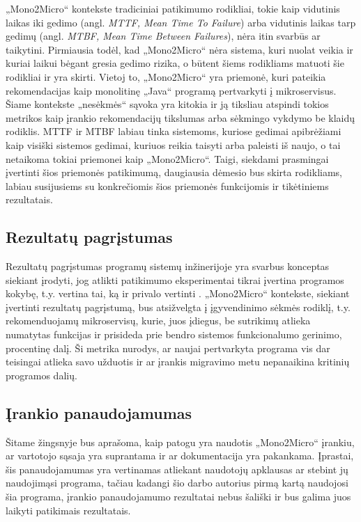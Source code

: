 \documentclass{VUMIFPSbakalaurinis}
\begin{document}
„Mono2Micro“ kontekste tradiciniai patikimumo rodikliai, tokie kaip vidutinis laikas iki gedimo (angl. \emph{MTTF, Mean Time To Failure}) arba vidutinis laikas tarp gedimų (angl. \emph{MTBF, Mean Time Between Failures}), nėra itin svarbūs ar taikytini. Pirmiausia todėl, kad „Mono2Micro“ nėra sistema, kuri nuolat veikia ir kuriai laikui bėgant gresia gedimo rizika, o būtent šiems rodikliams matuoti šie rodikliai ir yra skirti. Vietoj to, „Mono2Micro“ yra priemonė, kuri pateikia rekomendacijas kaip monolitinę „Java“ programą pertvarkyti į mikroservisus. Šiame kontekste „nesėkmės“ sąvoka yra kitokia ir ją tiksliau atspindi tokios metrikos kaip įrankio rekomendacijų tikslumas arba sėkmingo vykdymo be klaidų rodiklis. MTTF ir MTBF labiau tinka sistemoms, kuriose gedimai apibrėžiami kaip visiški sistemos gedimai, kuriuos reikia taisyti arba paleisti iš naujo, o tai netaikoma tokiai priemonei kaip „Mono2Micro“. Taigi, siekdami prasmingai įvertinti šios priemonės patikimumą, daugiausia dėmesio bus skirta rodikliams, labiau susijusiems su konkrečiomis šios priemonės funkcijomis ir tikėtiniems rezultatais.

\subsection{Rezultatų pagrįstumas}
Rezultatų pagrįstumas programų sistemų inžinerijoje yra svarbus konceptas siekiant įrodyti, jog atlikti patikimumo eksperimentai tikrai įvertina programos kokybę, t.y. vertina tai, ką ir privalo vertinti \cite{LMPV}. „Mono2Micro“ kontekste, siekiant įvertinti rezultatų pagrįstumą, bus atsižvelgta į įgyvendinimo sėkmės rodiklį, t.y. rekomenduojamų mikroservisų, kurie, juos įdiegus, be sutrikimų atlieka numatytas funkcijas ir prisideda prie bendro sistemos funkcionalumo gerinimo, procentinę dalį. Ši metrika nurodys, ar naujai pertvarkyta programa vis dar teisingai atlieka savo užduotis ir ar įrankis migravimo metu nepanaikina kritinių programos dalių.

\subsection{Įrankio panaudojamumas}
Šitame žingsnyje bus aprašoma, kaip patogu yra naudotis „Mono2Micro“ įrankiu, ar vartotojo sąsaja yra suprantama ir ar dokumentacija yra pakankama. Įprastai, šis panaudojamumas yra vertinamas atliekant naudotojų apklausas ar stebint jų naudojimąsi programa, tačiau kadangi šio darbo autorius pirmą kartą naudojosi šia programa, įrankio panaudojamumo rezultatai nebus šališki ir bus galima juos laikyti patikimais rezultatais.
\end{document}
